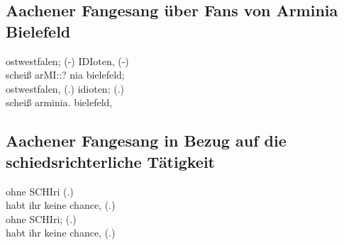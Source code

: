 \subsection{Aachener Fangesang über Fans von Arminia Bielefeld}
\begin{dialogue}
	 ostwestfalen; (-) IDIoten, (-) \\
	scheiß arMI::? nia bielefeld; \\
	ostwestfalen, (.) idioten; (.) \\
	scheiß arminia. bielefeld,
\end{dialogue}

\subsection{Aachener Fangesang in Bezug auf die schiedsrichterliche Tätigkeit}
\begin{dialogue}
	 ohne SCHIri (.) \\
	habt ihr keine chance, (.) \\
	ohne SCHIri; (.) \\
	habt ihr keine chance, (.)
\end{dialogue}
